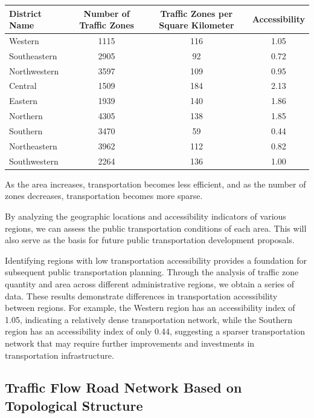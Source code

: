 \documentclass{mcmthesis}
\begin{document}
\begin{table}[htbp]
\centering
\begin{tabular}{lccc}
\toprule
\textbf{District Name} & \textbf{Number of Traffic Zones} & \textbf{Traffic Zones per Square Kilometer} & \textbf{Accessibility} \\
\midrule
Western       & 1115 & 116 & 1.05 \\
Southeastern  & 2905 & 92  & 0.72 \\
Northwestern  & 3597 & 109 & 0.95 \\
Central       & 1509 & 184 & 2.13 \\
Eastern       & 1939 & 140 & 1.86 \\
Northern      & 4305 & 138 & 1.85 \\
Southern      & 3470 & 59  & 0.44 \\
Northeastern  & 3962 & 112 & 0.82 \\
Southwestern  & 2264 & 136 & 1.00 \\
\bottomrule
\end{tabular}
\label{tab:traffic_zones}
\end{table}


As the area increases, transportation becomes less efficient, and as the number of zones decreases, transportation becomes more sparse.

By analyzing the geographic locations and accessibility indicators of various regions, we can assess the public transportation conditions of each area. This will also serve as the basis for future public transportation development proposals.

Identifying regions with low transportation accessibility provides a foundation for subsequent public transportation planning. Through the analysis of traffic zone quantity and area across different administrative regions, we obtain a series of data. These results demonstrate differences in transportation accessibility between regions. For example, the Western region has an accessibility index of 1.05, indicating a relatively dense transportation network, while the Southern region has an accessibility index of only 0.44, suggesting a sparser transportation network that may require further improvements and investments in transportation infrastructure.


\subsection{ Traffic Flow Road Network Based on Topological Structure}
\end{document}
